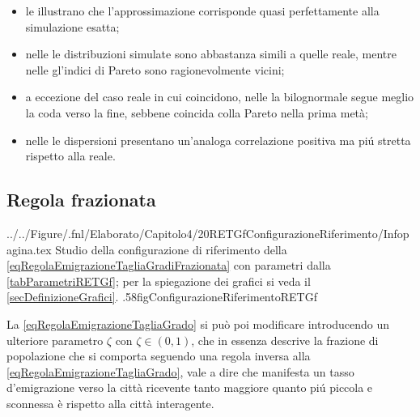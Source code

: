       \begin{itemize}[
        label=\(\diamond\),
      ]
        \item le  illustrano che l'approssimazione corrisponde quasi perfettamente alla simulazione esatta;
        \item nelle  le distribuzioni simulate sono abbastanza simili a quelle reale, mentre nelle  gl'indici di Pareto sono ragionevolmente vicini;
        \item a eccezione del caso reale in cui coincidono, nelle  la bilognormale segue meglio la coda verso la fine, sebbene coincida colla Pareto nella prima metà;
        \item nelle  le dispersioni presentano un'analoga correlazione positiva ma piú stretta rispetto alla reale.
      \end{itemize}

    \subsection{Regola frazionata}\label{secRETGf}

        {../../Figure/.fnl/Elaborato/Capitolo4/20RETGfConfigurazioneRiferimento/Infopagina.tex}
        {Studio della configurazione di riferimento della \ref{eqRegolaEmigrazioneTagliaGradiFrazionata} con parametri dalla \cref{tabParametriRETGf}; per la spiegazione dei grafici si veda il \cref{secDefinizioneGrafici}.}
        {.58\linewidth}{figConfigurazioneRiferimentoRETGf}

      La \ref{eqRegolaEmigrazioneTagliaGrado} si può poi modificare introducendo un ulteriore parametro \(\zeta\)
      con \(\zeta\in(0,1)\), che in essenza descrive la frazione di popolazione che si comporta seguendo una regola inversa alla \ref{eqRegolaEmigrazioneTagliaGrado}, vale a dire che manifesta un tasso d'emigrazione verso la città ricevente tanto maggiore quanto piú piccola e sconnessa è rispetto alla città interagente.

